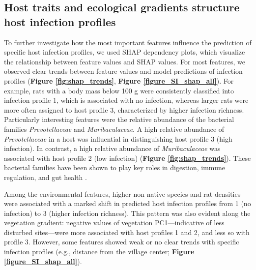 \documentclass[oneside, a4paper, onecolumn, 11pt]{article}
\begin{document}
\vspace{6 mm}

\subsection*{Host traits and ecological gradients structure host infection profiles}
To further investigate how the most important features influence the prediction of specific host infection profiles, we used SHAP dependency plots, which visualize the relationship between feature values and SHAP values. For most features, we observed clear trends between feature values and model predictions of infection profiles (\textbf{Figure \ref{fig:shap_trends}}, \textbf{Figure \ref{figure_SI_shap_all}}). For example, rats with a body mass below 100 g were consistently classified into infection profile 1, which is associated with no infection, whereas larger rats were more often assigned to host profile 3, characterized by higher infection richness. Particularly interesting features were the relative abundance of the bacterial families \textit{Prevotellaceae} and \textit{Muribaculaceae}. A high relative abundance of \textit{Prevotellaceae} in a host was influential in distinguishing host profile 3 (high infection). In contrast, a high relative abundance of \textit{Muribaculaceae} was associated with host profile 2 (low infection) (\textbf{Figure \ref{fig:shap_trends}}). These bacterial families have been shown to play key roles in digestion, immune regulation, and gut health \citep{Gellman2023-zm,Betancur-Murillo2022-cc,Zhu2024-ff}. 

Among the environmental features, higher non-native species and rat densities were associated with a marked shift in predicted host infection profiles from 1 (no infection) to 3 (higher infection richness). This pattern was also evident along the vegetation gradient: negative values of vegetation PC1---indicative of less disturbed sites---were more associated with host profiles 1 and 2, and less so with profile 3. However, some features showed weak or no clear trends with specific infection profiles (e.g., distance from the village center; \textbf{Figure \ref{figure_SI_shap_all}}). 
\end{document}
